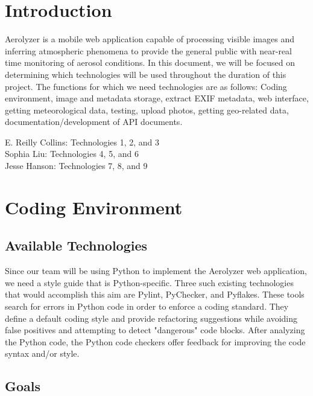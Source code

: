 \documentclass[onecolumn, draftclsnofoot,10pt, compsoc]{IEEEtran}
\begin{document}
\newpage
{}
\tableofcontents
\clearpage
\listoftables
\clearpage
\begin{flushleft}

\section{Introduction}

Aerolyzer is a mobile web application capable of processing visible images and inferring atmospheric phenomena to provide the general public with near-real time monitoring of aerosol conditions. In this document, we will be focused on determining which technologies will be used throughout the duration of this project. The functions for which we need technologies are as follows: Coding environment, image and metadata storage, extract EXIF metadata, web interface, getting meteorological data, testing, upload photos, getting geo-related data, documentation/development of API documents.\\

\medskip

E. Reilly Collins: Technologies 1, 2, and 3 \\
Sophia Liu: Technologies 4, 5, and 6 \\
Jesse Hanson: Technologies 7, 8, and 9


\section{Coding Environment}
\subsection{Available Technologies}
Since our team will be using Python to implement the Aerolyzer web application, we need a style guide that is Python-specific.
Three such existing technologies that would accomplish this aim are Pylint, PyChecker, and Pyflakes. These tools search for errors in Python code in order to enforce a coding standard. \cite{1}
They define a default coding style and provide refactoring suggestions while avoiding false positives and attempting to detect "dangerous" code blocks. 
After analyzing the Python code, the Python code checkers offer feedback for improving the code syntax and/or style.



\subsection{Goals}


\end{flushleft}
\end{document}

